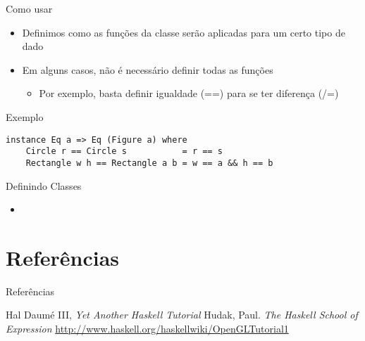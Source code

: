 \documentclass{beamer}
\begin{document}
		\begin{frame}[fragile]{Como usar}
		 
		 \begin{itemize}
		  \item Definimos como as funções da classe serão aplicadas para um certo tipo de dado
		  \item Em alguns casos, não é necessário definir todas as funções
		  \begin{itemize}
		   \item Por exemplo, basta definir igualdade (==) para se ter diferença (/=)
		  \end{itemize}

		 \end{itemize}
		 
		 \begin{block}{Exemplo}
		  \begin{lstlisting}
instance Eq a => Eq (Figure a) where
	Circle r == Circle s           = r == s
	Rectangle w h == Rectangle a b = w == a && h == b
		  \end{lstlisting}
		 \end{block}		 
		\end{frame}
		
		\begin{frame}[fragile]{Definindo Classes}
		 \begin{itemize}
		  \item 
		 \end{itemize}

		\end{frame}

			
\section{Referências}
\begin{frame}{Referências}
	\begin{thebibliography}{9}
	 Hal Daumé III, \textit{Yet Another Haskell Tutorial}
	 Hudak, Paul. \textit{The Haskell School of Expression}
	 \url{http://www.haskell.org/haskellwiki/OpenGLTutorial1}
	\end{thebibliography}
\end{frame}
	
	
\end{document}
